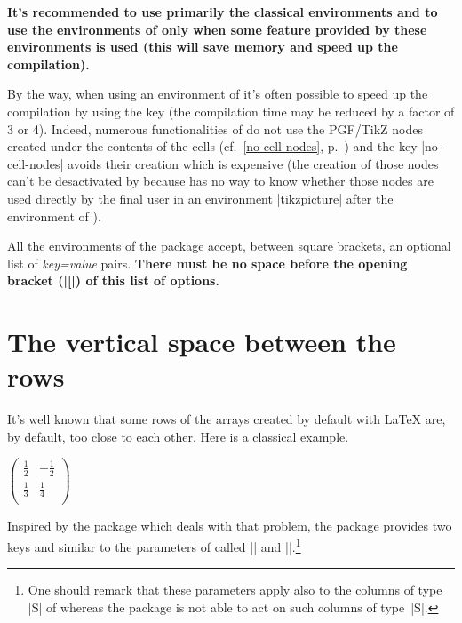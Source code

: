 \documentclass[dvipsnames]{article}
\begin{document}
\medskip
\textbf{It's recommended to use primarily the classical environments and to use
  the environments of  only when some feature provided by these
  environments is used (this will save memory and speed up the
  compilation).}

\medskip
By the way, when using an environment of  it's often possible to
speed up the compilation by using the key  (the
compilation time may be reduced by a factor of 3 or 4). Indeed, numerous
functionalities of  do not use the PGF/TikZ nodes created under
the contents of the cells (cf.~\ref{no-cell-nodes}, p.~\pageref{no-cell-nodes}) and the key
|no-cell-nodes| avoids their creation which is expensive (the creation of those
nodes can't be desactivated by  because  has no
way to know whether those nodes are used directly by the final user in an
environment |{tikzpicture}| after the environment of ).


\medskip 
All the environments of the package  accept, between square
brackets, an optional list of \textsl{key=value} pairs. \textbf{There must be
no space before the opening bracket (|[|) of this list of options.}


\section{The vertical space between the rows}

\label{cell-space}


It's well known that some rows of the arrays created by default with LaTeX
are, by default, too close to each other. Here is a classical example.

\medskip
\begin{Code}[width=9cm,show-output]
$\begin{pmatrix}
\frac{1}{2} & -\frac{1}{2} \\
\frac{1}{3} & \frac{1}{4} \\
\end{pmatrix}$
\end{Code}

\bigskip
{}
Inspired by the package  which deals with that problem, the
package  provides two keys 
and  similar to the parameters of
 called |\cellspacetoplimit| and
|\cellspacebottomlimit|.\footnote{One should remark that these parameters apply
  also to the columns of type |S| of  whereas the package
   is not able to act on such columns of type~|S|.}
\end{document}
